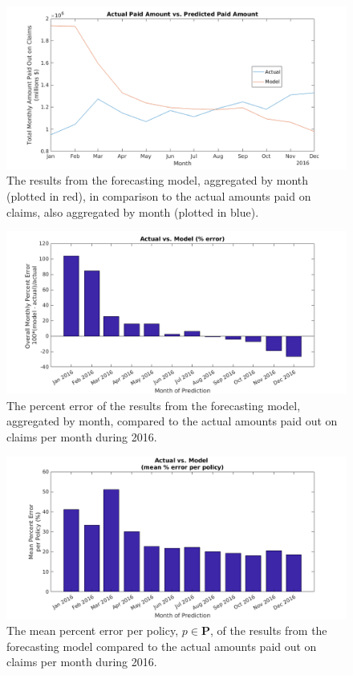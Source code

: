 \documentclass[12pt,letterpaper,titlepage]{article}
\begin{document}
			\begin{figure}[!ht]
			\centering
				\includegraphics[scale=0.5]{actual_vs_model.png}
				\caption{The results from the forecasting model, aggregated by month (plotted in red), in comparison to the actual amounts paid on claims, also aggregated by month (plotted in blue).}
				\label{fig:actual_vs_model}
			\end{figure}
			\FloatBarrier
			
			\begin{figure}[!ht]
			\centering
				\includegraphics[scale=0.5]{actual_vs_model_PE.png}
				\caption{The percent error of the results from the forecasting model, aggregated by month, compared to the actual amounts paid out on claims per month during 2016.}
				\label{fig:actual_vs_model_PE}
			\end{figure}
			\FloatBarrier
			
			\begin{figure}[!ht]
			\centering
				\includegraphics[scale=0.5]{actual_vs_model_meanPE.png}
				\caption{The mean percent error per policy, $p \in \mathbf{P}$, of the results from the forecasting model compared to the actual amounts paid out on claims per month during 2016.}
				\label{fig:actual_vs_model_meanPE}
			\end{figure}
			\FloatBarrier
			
\end{document}
